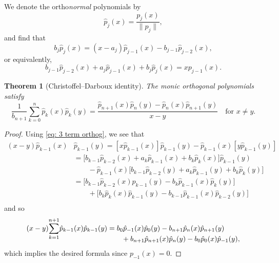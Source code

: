 \documentclass[12pt,a4paper]{article}
\newtheorem{theorem}{Theorem}
\begin{document}
We denote the ortho\emph{normal} polynomials by
\[
\hat p_j(x)=\frac{p_j(x)}{\|p_j\|},
\]
and find that
\begin{equation}\label{eq: p hat recurrence}
b_j\hat p_j(x)=(x-a_j)\hat p_{j-1}(x)-b_{j-1}\hat p_{j-2}(x),
\end{equation}
or equivalently,
\begin{equation}\label{eq: 3 term orthog}
b_{j-1}\hat p_{j-2}(x)+a_j\hat p_{j-1}(x)+b_j\hat p_j(x)=xp_{j-1}(x).
\end{equation}

\begin{theorem}[Christoffel--Darboux identity]
\label{thm: Christoffel-Darboux}
The monic orthogonal polynomials satisfy
\[
\frac{1}{b_{n+1}}\sum_{k=0}^n\hat p_k(x)\hat p_k(y)
	=\frac{\hat p_{n+1}(x)\hat p_n(y)-\hat p_n(x)\hat p_{n+1}(y)}{x-y}
	\quad\text{for $x\ne y$.}
\]
\end{theorem}
\begin{proof}
Using \eqref{eq: 3 term orthog}, we see that
\begin{align*}
(x-y)\hat p_{k-1}(x)&\hat p_{k-1}(y)
	=[x\hat p_{k-1}(x)]\hat p_{k-1}(y)
		-\hat p_{k-1}(x)[y\hat p_{k-1}(y)]\\
	&=\bigl[
	b_{k-1}\hat p_{k-2}(x)+a_k\hat p_{k-1}(x)+b_k\hat p_k(x)
	\bigr]\hat p_{k-1}(y)\\
	&\qquad{}-\hat p_{k-1}(x)\bigl[
	b_{k-1}\hat p_{k-2}(y)+a_k\hat p_{k-1}(y)+b_k\hat p_k(y)\bigr]\\
	&=\bigl[b_{k-1}\hat p_{k-2}(x)\hat p_{k-1}(y)
		-b_k\hat p_{k-1}(x)\hat p_k(y)\bigr]\\
	&\qquad{}+\bigl[b_k\hat p_k(x)\hat p_{k-1}(y)
		-b_{k-1}\hat p_{k-1}(x)\hat p_{k-2}(y)\bigr]\\
\end{align*}
and so
\begin{align*}
(x-y)\smash[b]{\sum_{k=1}^{n+1}}\hat p_{k-1}(x)\hat p_{k-1}(y)
	&=b_0\hat p_{-1}(x)\hat p_0(y)-b_{n+1}\hat p_n(x)\hat p_{n+1}(y)\\
	&\qquad{}+b_{n+1}\hat p_{n+1}(x)\hat p_n(y)
		-b_0\hat p_0(x)\hat p_{-1}(y),
\end{align*}
which implies the desired formula since $p_{-1}(x)=0$.
\end{proof}
\end{document}
